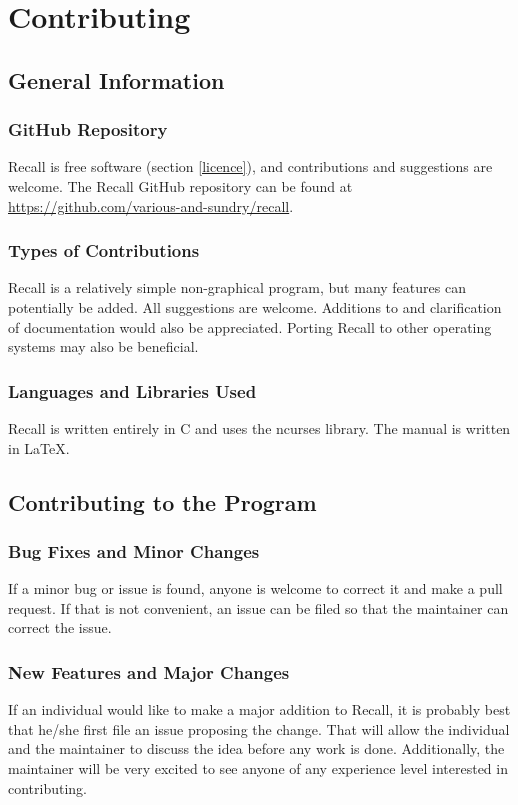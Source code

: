 \documentclass[letterpaper]{article}
\begin{document}
\section{Contributing} \label{contributing}
\subsection{General Information}
\subsubsection{GitHub Repository}
Recall is free software (section \ref{licence}), and contributions and suggestions are welcome. The Recall GitHub repository can be found at \href{https://github.com/various-and-sundry/recall}{https://github.com/various-and-sundry/recall}.

\subsubsection{Types of Contributions}
Recall is a relatively simple non-graphical program, but many features can potentially be added. All suggestions are welcome. Additions to and clarification of documentation would also be appreciated. Porting Recall to other operating systems may also be beneficial.

\subsubsection{Languages and Libraries Used}
Recall is written entirely in C and uses the ncurses library. The manual is written in \LaTeX.

\subsection{Contributing to the Program}
\subsubsection{Bug Fixes and Minor Changes}
If a minor bug or issue is found, anyone is welcome to correct it and make a pull request. If that is not convenient, an issue can be filed so that the maintainer can correct the issue.

\subsubsection{New Features and Major Changes}
If an individual would like to make a major addition to Recall, it is probably best that he/she first file an issue proposing the change. That will allow the individual and the maintainer to discuss the idea before any work is done. Additionally, the maintainer will be very excited to see anyone of any experience level interested in contributing.
\end{document}
